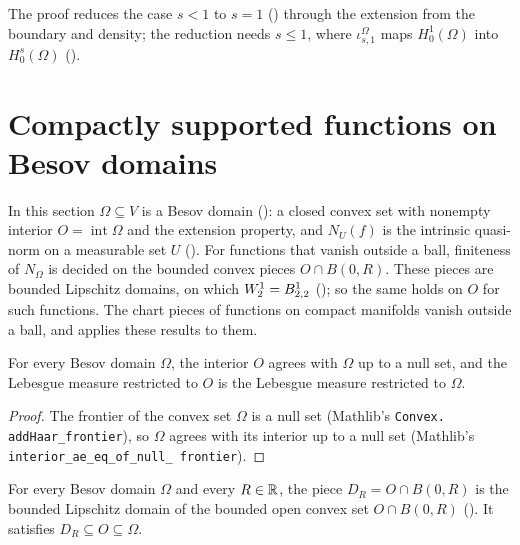 The proof reduces the case $s < 1$ to $s = 1$ () through
the extension from the boundary and density; the reduction needs $s \leq 1$, where
$\iota^\Omega_{s,1}$ maps $H^1_0(\Omega)$ into $H^s_0(\Omega)$ ().

\section{Compactly supported functions on Besov domains}
\label{sec:besov-domain-localisation}

In this section $\Omega \subseteq V$ is a Besov domain (): a closed convex
set with nonempty interior $O = \operatorname{int} \Omega$ and the extension property, and
$N_U(f)$ is the intrinsic quasi-norm on a measurable set $U$ (). For
functions that vanish outside a ball, finiteness of $N_\Omega$ is decided on the bounded convex
pieces $O \cap B(0, R)$. These pieces are bounded Lipschitz domains, on which
$W^{1}_{2} = B^1_{2,2}$ (); so the same holds on
$O$ for such functions. The chart pieces of functions on compact manifolds vanish outside a ball,
and  applies these results to them.

\begin{lemma}
\label{lem:besov-domain-interior-ae}
\leanok
{}
For every Besov domain $\Omega$, the interior $O$ agrees with $\Omega$ up to a null set, and the
Lebesgue measure restricted to $O$ is the Lebesgue measure restricted to $\Omega$.
\end{lemma}

\begin{proof}
\leanok
The frontier of the convex set $\Omega$ is a null set (Mathlib's \texttt{Convex.\allowbreak
addHaar\_\allowbreak frontier}), so $\Omega$ agrees with its interior up to a null set (Mathlib's
\texttt{interior\_\allowbreak ae\_\allowbreak eq\_\allowbreak of\_\allowbreak null\_\allowbreak
frontier}).
\end{proof}

\begin{definition}
\label{def:besov-domain-ball}
\leanok
{}
For every Besov domain $\Omega$ and every $R \in \mathbb{R}$, the piece $D_R = O \cap B(0, R)$ is the
bounded Lipschitz domain of the bounded open convex set $O \cap B(0, R)$
(). It satisfies $D_R \subseteq O \subseteq \Omega$.
\end{definition}

